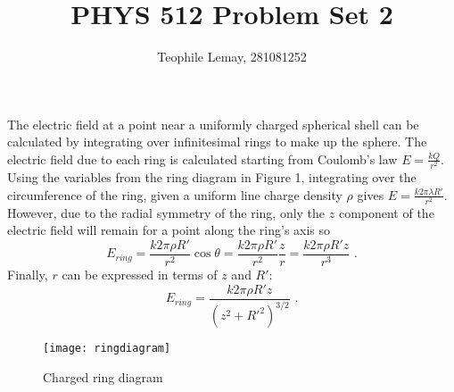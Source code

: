 \documentclass{article}
\title{PHYS 512 Problem Set 2}
\author{Teophile Lemay, 281081252}
\date{}
\newcommand{\<}[1]{\left\langle #1 \right\rangle }
\begin{document}
	\maketitle
	
\section{}
The electric field at a point near a uniformly charged spherical shell can be calculated by integrating over infinitesimal rings to make up the sphere. The electric field due to each ring is calculated starting from Coulomb's law $E = \frac{kQ}{r^2}$. Using the variables from the ring diagram in Figure 1, integrating over the circumference of the ring, given a uniform line charge density $\rho$ gives $E = \frac{k2\pi \lambda R'}{r^2}$. However, due to the radial symmetry of the ring, only the $z$ component of the electric field will remain for a point along the ring's axis so
\[E_{ring} = \frac{k2\pi\rho R'}{r^2} \cos{\theta} = \frac{k2\pi\rho R'}{r^2}\frac{z}{r} = \frac{k2\pi\rho R'z}{r^3}\text{ .}\]
Finally, $r$ can be expressed in terms of $z$ and $R'$:
\[E_{ring} = \frac{k2\pi\rho R'z}{\left(z^2 + R'^2\right)^{3/2}} \text{ .}\]
\begin{figure}[h]
	\caption{Charged ring diagram}
	\centering
	\texttt{[image: ringdiagram]}
\end{figure}
\end{document}

